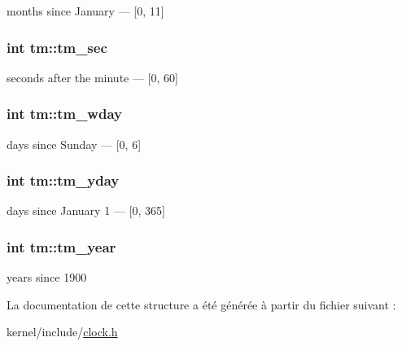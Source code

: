 months since January — \mbox{[}0, 11\mbox{]} \hypertarget{structtm_a4d098a9a5c03a00b2ee61e10851de81e}{
\subsubsection[{tm\-\_\-sec}]{\setlength{\rightskip}{0pt plus 5cm}int tm\-::tm\-\_\-sec}}\label{structtm_a4d098a9a5c03a00b2ee61e10851de81e}
seconds after the minute — \mbox{[}0, 60\mbox{]} \hypertarget{structtm_afe81a8c46f1c693c43f259b288859f4f}{
\subsubsection[{tm\-\_\-wday}]{\setlength{\rightskip}{0pt plus 5cm}int tm\-::tm\-\_\-wday}}\label{structtm_afe81a8c46f1c693c43f259b288859f4f}
days since Sunday — \mbox{[}0, 6\mbox{]} \hypertarget{structtm_a93a0ba77cc23796df84405dcbcc57eb1}{
\subsubsection[{tm\-\_\-yday}]{\setlength{\rightskip}{0pt plus 5cm}int tm\-::tm\-\_\-yday}}\label{structtm_a93a0ba77cc23796df84405dcbcc57eb1}
days since January 1 — \mbox{[}0, 365\mbox{]} \hypertarget{structtm_a33adf78fd6476b2120ce3b9c4a852053}{
\subsubsection[{tm\-\_\-year}]{\setlength{\rightskip}{0pt plus 5cm}int tm\-::tm\-\_\-year}}\label{structtm_a33adf78fd6476b2120ce3b9c4a852053}
years since 1900 

La documentation de cette structure a été générée à partir du fichier suivant \-:\begin{DoxyCompactItemize}
\item 
kernel/include/\hyperlink{clock_8h}{clock.\-h}\end{DoxyCompactItemize}
